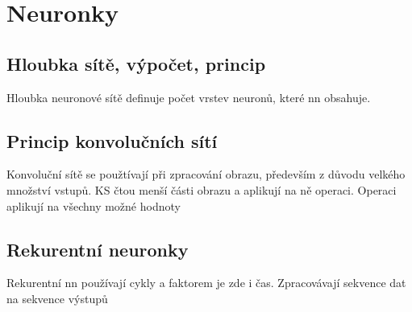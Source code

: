 \section{Neuronky}
\subsection{Hloubka sítě, výpočet, princip}

Hloubka neuronové sítě definuje počet vrstev neuronů, které nn obsahuje.

\subsection{Princip konvolučních sítí}
Konvoluční sítě se použtívají při zpracování obrazu, především z důvodu velkého množství vstupů.
KS čtou menší části obrazu a aplikují na ně operaci.
Operaci aplikují na všechny možné hodnoty

\subsection{Rekurentní neuronky}
Rekurentní nn používají cykly a faktorem je zde i čas.
Zpracovávají sekvence dat na sekvence výstupů